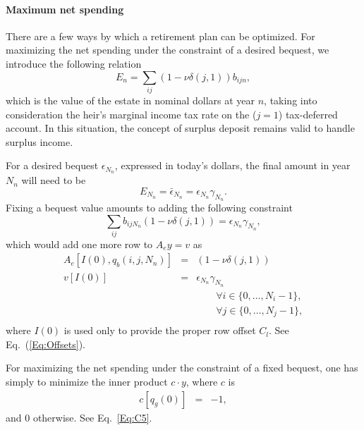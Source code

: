 \documentclass{report}[fleqn,12pt]
\begin{document}
\paragraph*{Maximum net spending}
There are a few ways by which a retirement plan can be optimized. For maximizing the net spending under
the constraint of a desired bequest, we introduce the following relation
\begin{equation}
	\label{Eq:Bequest}
	E_n = \sum_{ij} (1 - \nu\delta(j, 1)) b_{ijn},
\end{equation}
which is the value of the estate in nominal dollars at year $n$,
taking into consideration the heir's marginal income tax rate on the ($j=1$) tax-deferred account. 
In this situation, the concept of surplus deposit remains valid to handle
surplus income.

For a desired bequest $\epsilon_{N_n}$, expressed in today's
dollars, the final amount in year $N_n$ will need to be
\begin{equation}
	E_{N_n} = \bar\epsilon_{N_n} = \epsilon_{N_n} \gamma_{N_n}.
\end{equation}
Fixing a bequest value amounts to adding the following constraint
\begin{equation}
	\sum_{ij} b_{ijN_n} (1 - \nu\delta(j, 1)) = \epsilon_{N_n} \gamma_{N_n},
\end{equation}
which would add one more row to $A_ey = v$ as
\begin{eqnarray}
	A_e[I(0), q_b(i, j, N_n)] &=& (1 - \nu\delta(j, 1)) \nonumber \\
	v[I(0)] &=& \epsilon_{N_n}\gamma_{N_n} \\
	&&\qquad\forall i \in \{0,\ldots, N_i-1\},\nonumber\\
	&&\qquad\forall j \in \{0,\ldots, N_j-1\},\nonumber\\
\end{eqnarray}
where $I(0)$ is used only to provide the proper row offset $C_l$. See Eq.~(\ref{Eq:Offsets}).

For maximizing the net spending under the constraint of a fixed bequest, one has simply to
minimize the inner product $c\cdot y$, where $c$ is
\begin{eqnarray}
	c[q_g(0)] &=& -1,
\end{eqnarray}
and 0 otherwise. See Eq.~\ref{Eq:C5}.
\end{document}
